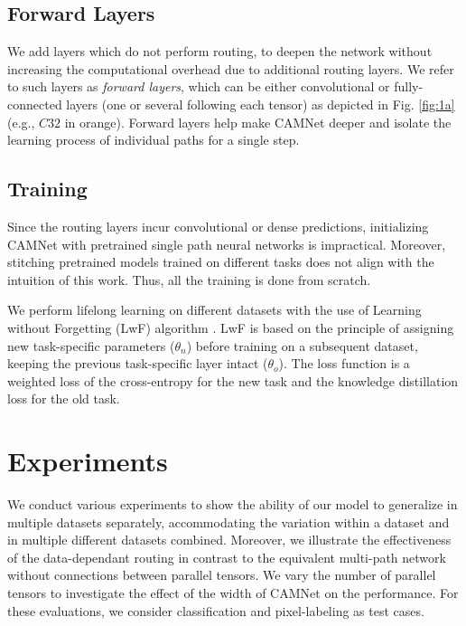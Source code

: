 \documentclass[10pt,twocolumn,letterpaper]{article}
\begin{document}
\subsection{Forward Layers}
\label{ss:sa_forw_layers}
\vspace{-0.05in}
We add layers which do not perform routing, to deepen the network without increasing the computational overhead due to additional routing layers. We refer to such layers as \textit{forward layers}, which can be either convolutional or fully-connected layers (one or several following each tensor) as depicted in Fig. \ref{fig:1a} (e.g., $C32$ in orange). Forward layers help make CAMNet deeper and isolate the learning process of individual paths for a single step.

\subsection{Training}
\label{ss:sa_training}
\vspace{-0.05in}
Since the routing layers incur convolutional or dense predictions, initializing CAMNet with pretrained single path neural networks is impractical. Moreover, stitching pretrained models trained on different tasks does not align with the intuition of this work. Thus, all the training is done from scratch. 


We perform lifelong learning on different datasets with the use of Learning without Forgetting (LwF) algorithm \cite{li2018learning}. LwF is based on the principle of assigning new task-specific parameters ($\theta_n$) before training on a subsequent dataset, keeping the previous task-specific layer intact ($\theta_o$). The loss function is a weighted loss of the cross-entropy for the new task and the knowledge distillation loss \cite{hinton2015distilling} for the old task.













\section{Experiments}
\label{se:experiments}
\vspace{-0.05in}
We conduct various experiments to show the ability of our model to generalize in multiple datasets separately, accommodating the variation within a dataset and in multiple different datasets combined. Moreover, we illustrate the effectiveness of the data-dependant routing in contrast to the equivalent multi-path network without connections between parallel tensors. We vary the number of parallel tensors to investigate the effect of the width of CAMNet on the performance. For these evaluations, we consider classification and pixel-labeling as test cases.
\end{document}
